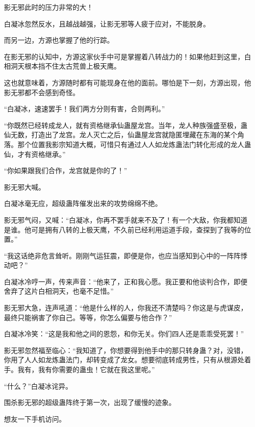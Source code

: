 \begin{this_body}
影无邪此时的压力非常的大！

白凝冰忽然反水，且越战越强，让影无邪等人疲于应对，不能脱身。

而另一边，方源也掌握了他的行踪。

在影无邪的认知中，方源这家伙手中可是掌握着八转战力的！如果他赶到这里，白相洞天根本挡不住太古荒兽上极天鹰。

这也就意味着，方源随时都有可能现身在他的面前。哪怕是下一刻，方源出现，他影无邪都不会感到奇怪。

“白凝冰，速速罢手！我们两方分则有害，合则两利。”

“你既然已经转成龙人，就有资格继承仙蛊屋龙宫。当年，龙人种族强盛至极，蛊仙无数，打造出了龙宫。龙人灭亡之后，仙蛊屋龙宫就隐匿埋藏在东海的某个角落。那个位置我影宗知道大概，可惜只有通过人人如龙炼蛊法门转化形成的龙人蛊仙，才有资格继承。”

“你如果跟我们合作，龙宫就是你的了！”

影无邪大喊。

白凝冰毫无应，超级蛊阵催发出来的攻势绵绵不绝。

影无邪气闷，又喊：“白凝冰，你再不罢手就来不及了！有一个大敌，你我都知道是谁。他可是拥有八转的上极天鹰，不久前已经利用运道手段，查探到了我等的位置。”

“我这话绝非危言耸听。刚刚气运狂震，即便是你，也应当感知到心中的一阵阵悸动吧？”

白凝冰冷哼一声，传来声音：“他来了，正和我心愿。我正要和他谈判合作，即便舍弃了这片白相洞天，也毫不足惜。”

影无邪大急，连声吼道：“他是什么样的人，你我还不清楚吗？你这是与虎谋皮，最终只能祸害了你自己。等等，你怎么偏要与他合作？”

白凝冰冷笑：“这是我和他之间的恩怨，和你无关。你们四人还是乖乖受死罢！”

影无邪忽然福至临心：“我知道了，你想要得到他手中的那只转身蛊？对，没错，你用了人人如龙炼蛊法门，却转变成了龙女。想要彻底转成男性，只有从根源处着手。我有，我有你需要的蛊虫！它就在我这里呢。”

“什么？”白凝冰诧异。

围杀影无邪的超级蛊阵终于第一次，出现了缓慢的迹象。

想友一下手机访问。

\end{this_body}

